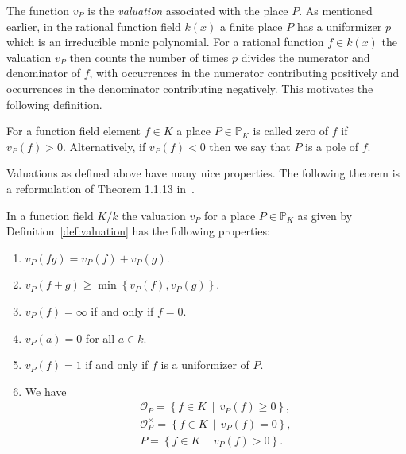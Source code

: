 The function \(v_{P}\) is the \textit{valuation} associated with the place \(P\). As mentioned earlier, in the rational function field \(k(x)\) a finite place \(P\) has a uniformizer \(p\) which is an irreducible monic polynomial. For a rational function \(f \in k(x)\) the valuation \(v_{P}\) then counts the number of times \(p\) divides the numerator and denominator of \(f\), with occurrences in the numerator contributing positively and occurrences in the denominator contributing negatively. This motivates the following definition.

\begin{definition}%
  \label{def:zero-and-pole}
  For a function field element \(f \in K\) a place \(P \in \mathbb{P}_{K}\) is called zero of \(f\) if \(v_{P}(f) > 0\). Alternatively, if \(v_{P}(f) < 0\) then we say that \(P\) is a pole of \(f\).
\end{definition}


Valuations as defined above have many nice properties. The following theorem is a reformulation of Theorem 1.1.13 in~\cite{stichtenoth-2009-algebraic-function-fields}.

\begin{theorem}%
  \label{thm:valuation-properties}
  In a function field \(K / k\) the valuation \(v_{P}\) for a place \(P \in \mathbb{P}_{K}\) as given by Definition~\ref{def:valuation} has the following properties:
  \begin{enumerate}[label = {(\arabic*)}]
    \item%
      \label{prop:valuation-multiplication}
      \(v_{P}(fg) = v_{P}(f) + v_{P}(g)\).

    \item%
      \label{prop:valuation-addition}
      \(v_{P}(f + g) \geq \min{\left\{v_{P}(f), v_{P}(g)\right\}}\).

    \item%
      \label{prop:valuation-zero}
      \(v_{P}(f) = \infty\) if and only if \(f = 0\).

    \item
      \(v_{P}(a) = 0\) for all \(a \in k\).

    \item
      \(v_{P}(f) = 1\) if and only if \(f\) is a uniformizer of \(P\).

    \item
      We have
      \begin{align*}
        \mathcal{O}_{P} = \left\{ f \in K \,\middle|\, v_{P}(f) \geq 0 \right\},       \\
        \mathcal{O}_{P}^{\times} = \left\{ f \in K \,\middle|\, v_{P}(f) = 0 \right\}, \\
        P = \left\{ f \in K \,\middle|\, v_{P}(f) > 0 \right\}.
      \end{align*}
  \end{enumerate}
\end{theorem}

